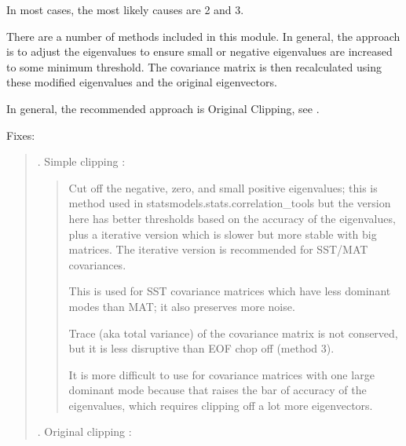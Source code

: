 \documentclass[letterpaper,10pt,english]{sphinxmanual}
\begin{document}
\sphinxAtStartPar
In most cases, the most likely causes are 2 and 3.

\sphinxAtStartPar
There are a number of methods included in this module. In general, the approach
is to adjust the eigenvalues to ensure small or negative eigenvalues are
increased to some minimum threshold. The covariance matrix is then re\sphinxhyphen{}calculated
using these modified eigenvalues and the original eigenvectors.

\sphinxAtStartPar
In general, the recommended approach is Original Clipping, see
{\hyperref[\detokenize{misc:glomar_gridding.covariance_tools.eigenvalue_clip}]{}}.

\sphinxAtStartPar
Fixes:
\begin{quote}

. Simple clipping \sphinxhyphen{}
{\hyperref[\detokenize{misc:glomar_gridding.covariance_tools.simple_clipping}]{}}:
\begin{quote}

\sphinxAtStartPar
Cut off the negative, zero, and small positive eigenvalues; this is
method used in statsmodels.stats.correlation\_tools but the version here
has better thresholds based on the accuracy of the eigenvalues, plus a
iterative version which is slower but more stable with big matrices. The
iterative version is recommended for SST/MAT covariances.

\sphinxAtStartPar
This is used for SST covariance matrices which have less dominant modes
than MAT; it also preserves more noise.

\sphinxAtStartPar
Trace (aka total variance) of the covariance matrix is not conserved,
but it is less disruptive than EOF chop off (method 3).

\sphinxAtStartPar
It is more difficult to use for covariance matrices with one large
dominant mode because that raises the bar of accuracy of the
eigenvalues, which requires clipping off a lot more eigenvectors.
\end{quote}

. Original clipping \sphinxhyphen{}
{\hyperref[\detokenize{misc:glomar_gridding.covariance_tools.eigenvalue_clip}]{}}:
\begin{quote}


\end{quote}
\end{quote}
\end{document}
